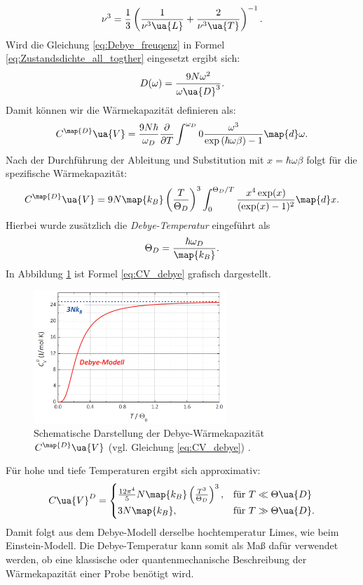 \begin{equation*}
  \nu^3= \frac{1}{3}\left(\frac{1}{\nu^3\ua{L}} + \frac{2}{\nu^3\ua{T}}\right)^{-1}.
\end{equation*}
Wird die Gleichung \eqref{eq:Debye_freuqenz} in Formel \eqref{eq:Zustandsdichte_all_togther}
eingesetzt ergibt sich:
\begin{equation}
  \label{eq:Zustandsdichte_Debye}
  D(\omega)= \frac{9N\omega^2}{\omega\ua{D}^3}.
\end{equation}
Damit können wir die Wärmekapazität definieren als:
\begin{equation}
  \label{eq:CVD_ohne_x}
  C^{\map{D}}\ua{V}=\frac{9N\hbar}{\omega_D}\frac{\partial}{\partial T}\int^{\omega_D}{0}\frac{\omega^3}{\exp\left(\hbar\omega\beta\right)-1} \map{d}\omega.
\end{equation}
Nach der Durchführung der Ableitung und Substitution mit $x=\hbar\omega\beta$
folgt für die spezifische Wärmekapazität:
\begin{equation}
  \label{eq:CV_debye}
  C^{\map{D}}\ua{V}=9N\map{k_B}\left(\frac{T}{\Theta_D}\right)^3\int^{\Theta_D/T}_{0} \frac{x^4\exp(x)}{(\exp(x)-1)^2}\map{d}x.
\end{equation}
Hierbei wurde zusätzlich die \emph{Debye-Temperatur} eingeführt als
\begin{equation}
  \label{eq:Debye_Temp}
  \Theta_D = \frac{\hbar\omega_D}{\map{k_B}}.
\end{equation}
In Abbildung \ref{fig: CVD_plot} ist Formel \eqref{eq:CV_debye} grafisch dargestellt.
\begin{figure}
  \centering
  \includegraphics[width = 0.65\textwidth]{./content/images/C_V_debye.PNG}
  \caption{Schematische Darstellung der Debye-Wärmekapazität $C^{\map{D}}\ua{V}$ (vgl. Gleichung \eqref{eq:CV_debye})  \cite[S. 228]{marx}.}
  \label{fig: CVD_plot}
\end{figure}
Für hohe und tiefe Temperaturen ergibt sich approximativ:
\begin{equation}
  C\ua{V}^{D}=
  \begin{cases}
    \frac{12\pi^4}{5}N\map{k_B}\left(\frac{T^3}{\Theta_D}\right)^3, &\text{für } T\ll\Theta\ua{D}  \\
     3N\map{k_B}, & \text{für } T \gg \Theta\ua{D}.
  \end{cases}
\end{equation}
Damit folgt aus dem Debye-Modell derselbe hochtemperatur Limes, wie beim Einstein-Modell.
Die Debye-Temperatur kann somit als Maß dafür verwendet werden, ob eine klassische
oder quantenmechanische Beschreibung der Wärmekapazität einer Probe benötigt wird.
